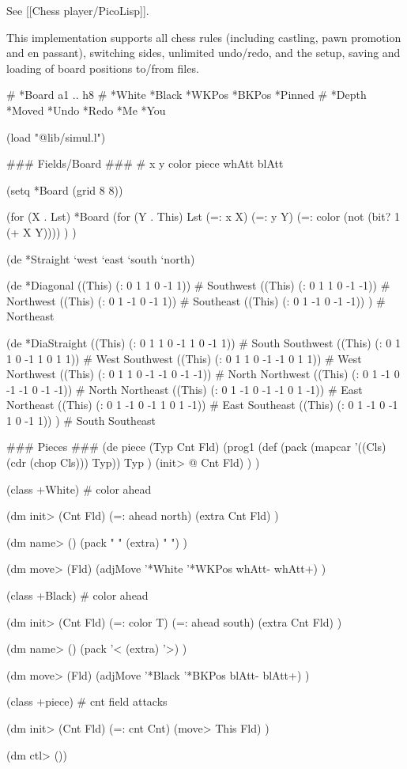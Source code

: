 \begin{wideverbatim}

See [[Chess player/PicoLisp]].

This implementation supports all chess rules (including castling, pawn promotion
and en passant), switching sides, unlimited undo/redo, and the setup, saving and
loading of board positions to/from files.


# *Board a1 .. h8
# *White *Black *WKPos *BKPos *Pinned
# *Depth *Moved *Undo *Redo *Me *You
 
(load "@lib/simul.l")

### Fields/Board ###
# x y color piece whAtt blAtt
 
(setq *Board (grid 8 8))
 
(for (X . Lst) *Board
   (for (Y . This) Lst
      (=: x X)
      (=: y Y)
      (=: color (not (bit? 1 (+ X Y)))) ) )
 
(de *Straight `west `east `south `north)
 
(de *Diagonal
   ((This) (: 0 1  1  0 -1  1))   # Southwest
   ((This) (: 0 1  1  0 -1 -1))   # Northwest
   ((This) (: 0 1 -1  0 -1  1))   # Southeast
   ((This) (: 0 1 -1  0 -1 -1)) ) # Northeast
 
(de *DiaStraight
   ((This) (: 0 1  1  0 -1  1  0 -1  1))   # South Southwest
   ((This) (: 0 1  1  0 -1  1  0  1  1))   # West Southwest
   ((This) (: 0 1  1  0 -1 -1  0  1  1))   # West Northwest
   ((This) (: 0 1  1  0 -1 -1  0 -1 -1))   # North Northwest
   ((This) (: 0 1 -1  0 -1 -1  0 -1 -1))   # North Northeast
   ((This) (: 0 1 -1  0 -1 -1  0  1 -1))   # East Northeast
   ((This) (: 0 1 -1  0 -1  1  0  1 -1))   # East Southeast
   ((This) (: 0 1 -1  0 -1  1  0 -1  1)) ) # South Southeast
 

\end{wideverbatim}

\begin{wideverbatim}
 
### Pieces ###
(de piece (Typ Cnt Fld)
   (prog1
      (def
         (pack (mapcar '((Cls) (cdr (chop Cls))) Typ))
         Typ )
      (init> @ Cnt Fld) ) )
 
 
(class +White)
# color ahead
 
(dm init> (Cnt Fld)
   (=: ahead north)
   (extra Cnt Fld) )
 
(dm name> ()
   (pack " " (extra) " ") )
 
(dm move> (Fld)
   (adjMove '*White '*WKPos whAtt- whAtt+) )
 
 
(class +Black)
# color ahead
 
(dm init> (Cnt Fld)
   (=: color T)
   (=: ahead south)
   (extra Cnt Fld) )
 
(dm name> ()
   (pack '< (extra) '>) )
 
(dm move> (Fld)
   (adjMove '*Black '*BKPos blAtt- blAtt+) )
 
 
(class +piece)
# cnt field attacks
 
(dm init> (Cnt Fld)
   (=: cnt Cnt)
   (move> This Fld) )
 
(dm ctl> ())
 

\end{wideverbatim}

